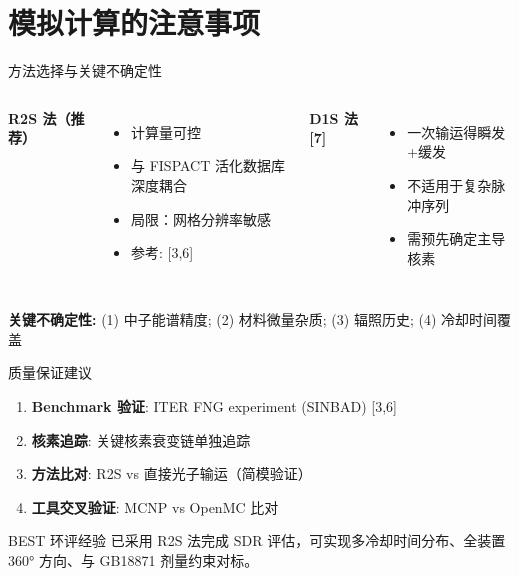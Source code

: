 \documentclass[aspectratio=169]{ctexbeamer}
\begin{document}
\section{模拟计算的注意事项}

\begin{frame}{方法选择与关键不确定性}
	\begin{columns}[T]
		\textbf{R2S 法（推荐）}
		\begin{itemize}
			\item 计算量可控
			\item 与 FISPACT 活化数据库深度耦合
			\item 局限：网格分辨率敏感
			\item 参考: [3,6]
		\end{itemize}

		\textbf{D1S 法 [7]}
		\begin{itemize}
			\item 一次输运得瞬发+缓发
			\item 不适用于复杂脉冲序列
			\item 需预先确定主导核素
		\end{itemize}
	\end{columns}

	\vspace{10pt}
	\textbf{关键不确定性:} (1) 中子能谱精度; (2) 材料微量杂质; (3) 辐照历史; (4) 冷却时间覆盖
\end{frame}

\begin{frame}{质量保证建议}
	\begin{enumerate}
		\item \textbf{Benchmark 验证}: ITER FNG experiment (SINBAD) [3,6]
		\item \textbf{核素追踪}: 关键核素衰变链单独追踪
		\item \textbf{方法比对}: R2S vs 直接光子输运（简模验证）
		\item \textbf{工具交叉验证}: MCNP vs OpenMC 比对
	\end{enumerate}

	\vspace{8pt}
	\begin{block}{BEST 环评经验}
		已采用 R2S 法完成 SDR 评估，可实现多冷却时间分布、全装置 360° 方向、与 GB18871 剂量约束对标。
	\end{block}
\end{frame}

\end{document}
